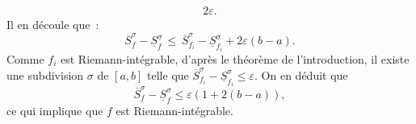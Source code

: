{\begin{enumerate}
{\begin{eqnarray*}
2\varepsilon.
\end{eqnarray*}
Il en d\'ecoule que~:
\begin{equation*}
\overline{S}_{f}^{\sigma} - \underline{S}_{f}^{\sigma}\, \leq\,
\overline{S}_{f_{i}}^{\sigma} - \underline{S}_{f_{i}}^{\sigma} +
2\varepsilon (b- a).
\end{equation*}
Comme $f_{i}$ est Riemann-int\'egrable, d'apr\`es le th\'eor\`eme
de l'introduction, il existe une subdivision $\sigma$ de $[a, b]$ telle que
$\overline{S}_{f_{i}}^{\sigma} - \underline{S}_{f_{i}}^{\sigma}
\leq \varepsilon$. On en d\'eduit que
\begin{equation*}
\overline{S}_{f}^{\sigma} - \underline{S}_{f}^{\sigma} \leq
\varepsilon \left(1 + 2(b-a)\right),
\end{equation*}
ce qui implique que $f$ est Riemann-int\'egrable.}
\end{enumerate}
}
